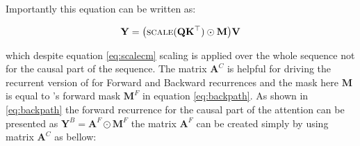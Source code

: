 \begin{center}
\end{center}

Importantly this equation can  be written as:

\begin{align}
   \mathbf{Y} = \big(\textsc{scale}(\mathbf{Q}\mathbf{K}^{\top} )\odot \mathbf{M}\big) \mathbf{V}
\end{align}

which despite equation \eqref{eq:scalecm} scaling is applied over the whole sequence not for the causal part of the sequence.
The matrix $\mathbf{A}^{C}$ is helpful for driving the recurrent version of \lion for Forward and Backward recurrences and the mask here $\mathbf{M}$ is equal to \lion's forward mask $\mathbf{M}^F$ in equation \eqref{eq:backpath}. As shown in \eqref{eq:backpath} the forward recurrence for the causal part of the attention can be presented as $\mathbf{Y}^{B} = \mathbf{A}^F \odot \mathbf{M}^F$ the matrix $\mathbf{A}^F$ can be created simply by using matrix $\mathbf{A}^{C}$ as bellow:


